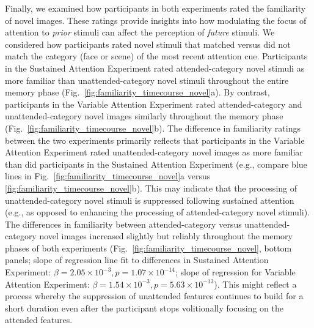 \documentclass[english]{article}
\begin{document}
Finally, we examined how participants in both experiments rated the familiarity of novel images.  These ratings provide insights into how modulating the focus of attention to \textit{prior} stimuli can affect the perception of \textit{future} stimuli.  We considered how participants rated novel stimuli that matched versus did not match the category (face or scene) of the most recent attention cue.  Participants in the Sustained Attention Experiment rated attended-category novel stimuli as more familiar than unattended-category novel stimuli throughout the entire memory phase (Fig.~\ref{fig:familiarity_timecourse_novel}a).  By contrast, participants in the Variable Attention Experiment rated attended-category and unattended-category novel images similarly throughout the memory phase (Fig.~\ref{fig:familiarity_timecourse_novel}b).  The difference in familiarity ratings between the two experiments primarily reflects that participants in the Variable Attention Experiment rated unattended-category novel images as more familiar than did participants in the Sustained Attention Experiment (e.g., compare blue lines in Fig.~\ref{fig:familiarity_timecourse_novel}a versus \ref{fig:familiarity_timecourse_novel}b).  This may indicate that the processing of unattended-category novel stimuli is suppressed following sustained attention (e.g., as opposed to enhancing the processing of attended-category novel stimuli).  The differences in familiarity between attended-category versus unattended-category novel images increased slightly but reliably throughout the memory phases of both experiments (Fig.~\ref{fig:familiarity_timecourse_novel}, bottom panels; slope of regression line fit to differences in Sustained Attention Experiment: $\beta = 2.05 \times 10^{-3}, p = 1.07 \times 10^{-14} $; slope of regression for Variable Attention Experiment: $\beta = 1.54 \times 10^{-3}, p = 5.63 \times 10^{-13} $).  This might reflect a process whereby the suppression of unattended features continues to build for a short duration even after the participant stops volitionally focusing on the attended features.
\end{document}
